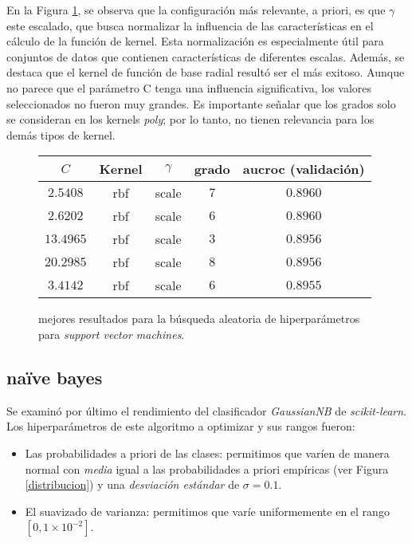 En la Figura \ref{support vector machines}, se observa que la configuración más relevante, a priori, es que $\gamma$ este escalado, que busca normalizar la influencia de las características en el cálculo de la función de kernel. Esta normalización es especialmente útil para conjuntos de datos que contienen características de diferentes escalas. Además, se destaca que el kernel de función de base radial resultó ser el más exitoso. Aunque no parece que el parámetro C tenga una influencia significativa, los valores seleccionados no fueron muy grandes. Es importante señalar que los grados solo se consideran en los kernels \textit{poly}; por lo tanto, no tienen relevancia para los demás tipos de kernel.
\vspace{0.5em}
\begin{figure}[!htbp]
    \begin{center}
        \begin{tabular}{ |c|c|c|c|c| } 
         \hline
        $C$ & Kernel & $\gamma$ & grado & aucroc (validación) \\
        \hline
        $2.5408$ & rbf     & scale & $7$ & $0.8960$ \\ 
        $2.6202$ & rbf    & scale & $6$ & $0.8960$ \\
        $13.4965$ & rbf   & scale & $3$ & $0.8956$ \\ 
        $20.2985$ & rbf   & scale & $8$ & $0.8956$ \\
        $3.4142$ & rbf    & scale & $6$ & $0.8955$ \\ 
        \hline
        \end{tabular}
    \end{center}
    \caption{mejores resultados para la búsqueda aleatoria de hiperparámetros para \textit{support vector machines}.} \label{support vector machines}
\end{figure}

\subsection{naïve bayes}
Se examinó por último el rendimiento del clasificador \textit{GaussianNB} de \textit{scikit-learn}. Los hiperparámetros de este algoritmo a optimizar y sus rangos fueron:

\begin{itemize}
    \item Las probabilidades a priori de las clases: permitimos que varíen de manera normal con \textit{media} igual a las probabilidades a priori empíricas (ver Figura \ref{distribucion}) y una \textit{desviación estándar} de $\sigma = 0.1$.
    \item El suavizado de varianza: permitimos que varíe uniformemente en el rango $[0, 1 \times 10^{-2}]$.
\end{itemize}

